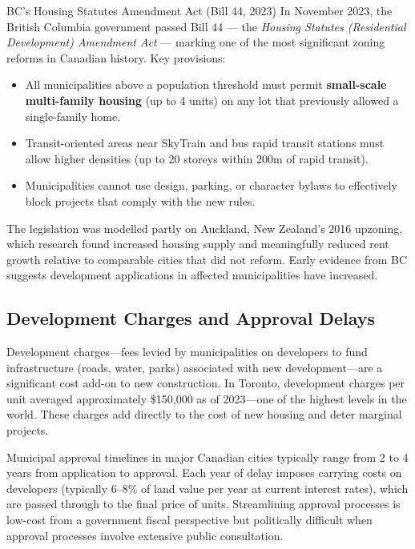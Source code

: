 \begin{canexample}{BC's Housing Statutes Amendment Act (Bill 44, 2023)}
In November 2023, the British Columbia government passed Bill 44 --- the
\textit{Housing Statutes (Residential Development) Amendment Act} --- marking one of the
most significant zoning reforms in Canadian history. Key provisions:
\begin{itemize}
  \item All municipalities above a population threshold must permit \textbf{small-scale
        multi-family housing} (up to 4 units) on any lot that previously allowed a
        single-family home.
  \item Transit-oriented areas near SkyTrain and bus rapid transit stations must allow
        higher densities (up to 20 storeys within 200m of rapid transit).
  \item Municipalities cannot use design, parking, or character bylaws to effectively
        block projects that comply with the new rules.
\end{itemize}
The legislation was modelled partly on Auckland, New Zealand's 2016 upzoning, which research
found increased housing supply and meaningfully reduced rent growth relative to comparable
cities that did not reform. Early evidence from BC suggests development applications in
affected municipalities have increased.
\end{canexample}

\subsection{Development Charges and Approval Delays}

Development charges---fees levied by municipalities on developers to fund infrastructure (roads, water, parks) associated with new development---are a significant cost add-on to new construction. In Toronto, development charges per unit averaged approximately \$150,000 as of 2023---one of the highest levels in the world. These charges add directly to the cost of new housing and deter marginal projects.

Municipal approval timelines in major Canadian cities typically range from 2 to 4 years from application to approval. Each year of delay imposes carrying costs on developers (typically 6--8\% of land value per year at current interest rates), which are passed through to the final price of units. Streamlining approval processes is low-cost from a government fiscal perspective but politically difficult when approval processes involve extensive public consultation.


